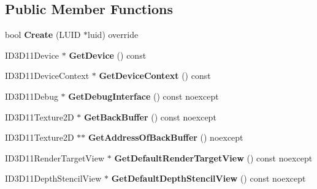 \subsection*{Public Member Functions}
\begin{DoxyCompactItemize}
\item 
\mbox{\label{class_blade_1_1_d3_d11_context_a1a2d5dfee039abbd1676c0cb37e52c57}} 
bool {\bfseries Create} (L\+U\+ID $\ast$luid) override
\item 
\mbox{\label{class_blade_1_1_d3_d11_context_ac1e4c978a9e3de3d7b62977247fc1af5}} 
I\+D3\+D11\+Device $\ast$ {\bfseries Get\+Device} () const
\item 
\mbox{\label{class_blade_1_1_d3_d11_context_a6524137ac9799d23ad57ec3043d14fad}} 
I\+D3\+D11\+Device\+Context $\ast$ {\bfseries Get\+Device\+Context} () const
\item 
\mbox{\label{class_blade_1_1_d3_d11_context_a36f3e92cfea284ca7c4005c4e72877b6}} 
I\+D3\+D11\+Debug $\ast$ {\bfseries Get\+Debug\+Interface} () const noexcept
\item 
\mbox{\label{class_blade_1_1_d3_d11_context_ac36a54ee583e2fa174d828eaca2d71b9}} 
I\+D3\+D11\+Texture2D $\ast$ {\bfseries Get\+Back\+Buffer} () const noexcept
\item 
\mbox{\label{class_blade_1_1_d3_d11_context_aa90193c67be01cfe7e07f5f97d7cd82e}} 
I\+D3\+D11\+Texture2D $\ast$$\ast$ {\bfseries Get\+Address\+Of\+Back\+Buffer} () noexcept
\item 
\mbox{\label{class_blade_1_1_d3_d11_context_a558c990e5708fff4d897fabc14e20ef6}} 
I\+D3\+D11\+Render\+Target\+View $\ast$ {\bfseries Get\+Default\+Render\+Target\+View} () const noexcept
\item 
\mbox{\label{class_blade_1_1_d3_d11_context_a59a77d77ae22a58ace6629f3b5bd320a}} 
I\+D3\+D11\+Depth\+Stencil\+View $\ast$ {\bfseries Get\+Default\+Depth\+Stencil\+View} () const noexcept
\item 
$$
\end{DoxyCompactItemize}

